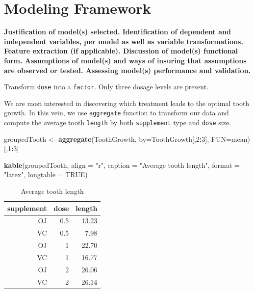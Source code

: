 \documentclass[12pt,oneside]{chicagocapstone}
\newenvironment{Shaded}{\begin{snugshade}}{\end{snugshade}}
\newcommand{\DataTypeTok}[1]{\textcolor[rgb]{0.13,0.29,0.53}{#1}}
\newcommand{\DecValTok}[1]{\textcolor[rgb]{0.00,0.00,0.81}{#1}}
\newcommand{\KeywordTok}[1]{\textcolor[rgb]{0.13,0.29,0.53}{\textbf{#1}}}
\newcommand{\NormalTok}[1]{#1}
\newcommand{\OperatorTok}[1]{\textcolor[rgb]{0.81,0.36,0.00}{\textbf{#1}}}
\newcommand{\OtherTok}[1]{\textcolor[rgb]{0.56,0.35,0.01}{#1}}
\newcommand{\StringTok}[1]{\textcolor[rgb]{0.31,0.60,0.02}{#1}}
\begin{document}
\newpage

\hypertarget{methodology-modeling}{%
\section*{Modeling Framework}\label{methodology-modeling}}

\textbf{Justification of model(s) selected. Identification of dependent and independent variables, per model as well as variable transformations. Feature extraction (if applicable). Discussion of model(s) functional form. Assumptions of model(s) and ways of insuring that assumptions are observed or tested. Assessing model(s) performance and validation.}

Transform \texttt{dose} into a \texttt{factor}. Only three dosage levels are present.
\begin{Shaded}
\end{Shaded}
We are most interested in discovering which treatment leads to the optimal tooth growth.
In this vein, we use \texttt{aggregate} function to transform our data and compute the average tooth \texttt{length} by both \texttt{supplement} type and \texttt{dose} size.
\begin{Shaded}
\begin{Highlighting}[]
\NormalTok{groupedTooth <-}\StringTok{ }\KeywordTok{aggregate}\NormalTok{(ToothGrowth, }\DataTypeTok{by=}\NormalTok{ToothGrowth[,}\DecValTok{2}\OperatorTok{:}\DecValTok{3}\NormalTok{], }\DataTypeTok{FUN=}\NormalTok{mean)[,}\DecValTok{1}\OperatorTok{:}\DecValTok{3}\NormalTok{]}

\KeywordTok{kable}\NormalTok{(groupedTooth, }\DataTypeTok{align =} \StringTok{"r"}\NormalTok{, }\DataTypeTok{caption =} \StringTok{"Average tooth length"}\NormalTok{,}
      \DataTypeTok{format =} \StringTok{"latex"}\NormalTok{, }\DataTypeTok{longtable =} \OtherTok{TRUE}\NormalTok{)}
\end{Highlighting}
\end{Shaded}
\begin{longtable}[t]{r|r|r}
\caption{\label{tab:group}Average tooth length}\\
\hline
supplement & dose & length\\
\hline
OJ & 0.5 & 13.23\\
\hline
VC & 0.5 & 7.98\\
\hline
OJ & 1 & 22.70\\
\hline
VC & 1 & 16.77\\
\hline
OJ & 2 & 26.06\\
\hline
VC & 2 & 26.14\\
\hline
\end{longtable}
\newpage
\end{document}
